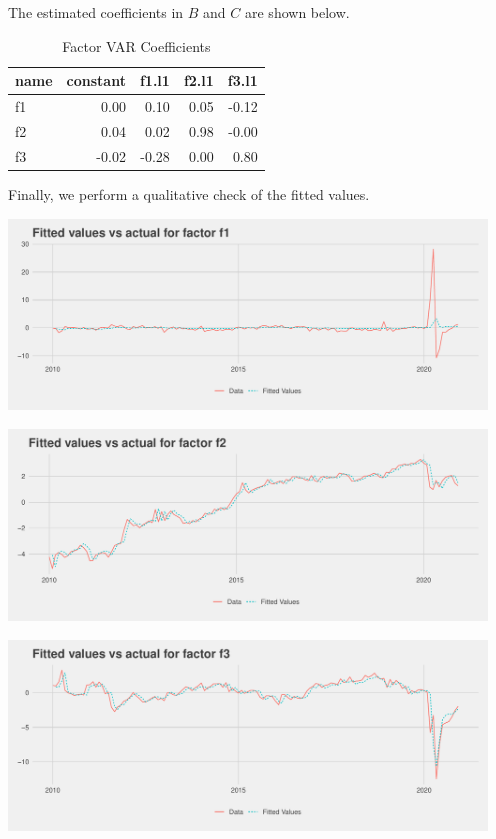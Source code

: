 \documentclass[11pt, letterpaper]{article}\usepackage[]{graphicx}\usepackage[]{color}
\begin{document}
The estimated coefficients in $B$ and $C$ are shown below.
\begin{table}[!h]
\centering
\begingroup\footnotesize
\begin{tabular}{lrrrr}
  \hline
name & constant & f1.l1 & f2.l1 & f3.l1 \\ 
  \hline
f1 & 0.00 & 0.10 & 0.05 & -0.12 \\ 
  f2 & 0.04 & 0.02 & 0.98 & -0.00 \\ 
  f3 & -0.02 & -0.28 & 0.00 & 0.80 \\ 
   \hline
\end{tabular}
\endgroup
\caption{Factor VAR Coefficients} 
\end{table}



Finally, we perform a qualitative check of the fitted values.


{\centering \includegraphics[width=5in,height=2in]{figure/unnamed-chunk-8-1} 

}




{\centering \includegraphics[width=5in,height=2in]{figure/unnamed-chunk-8-2} 

}




{\centering \includegraphics[width=5in,height=2in]{figure/unnamed-chunk-8-3} 

}
\end{document}
